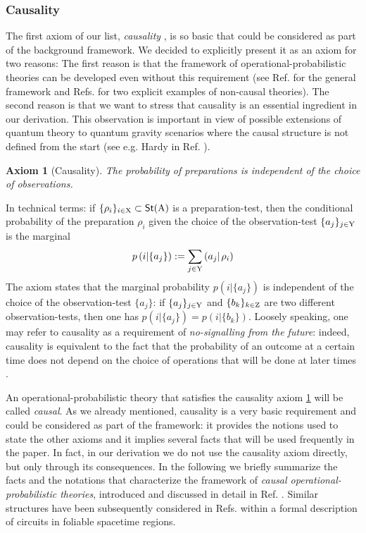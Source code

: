 \documentclass[12pt,aps,pra,showpacs,groupedaddress]{revtex4-1}
\newtheorem{axiom}{Axiom}\newtheorem{postulate}{Postulate}
\def\Stset{{\mathsf{St}}}
\def\SC#1#2{\left(#1\right|\left.\!#2\right)}  \def\Tr{{\rm Tr}}
\begin{document}
\subsubsection{Causality}


The first axiom of our list, \emph{causality} \cite{purification}, is so basic that could
be considered as part of the background framework. We decided to explicitly present it as an axiom for two reasons: The first reason is that the
framework of operational-probabilistic theories can be developed even
without this requirement (see Ref.\cite{purification} for the general
framework and Refs.  \cite{supermaps, comblong}  for two explicit
examples of non-causal theories).  The second reason is that we want
to stress that causality is an essential ingredient in our derivation.
This observation is important in view of possible extensions of
quantum theory to quantum gravity scenarios where the causal structure
is not defined from the start (see e.g. Hardy in Ref. \cite{causaloid}).

\begin{axiom}[Causality]\label{ax:caus}  
The probability of  preparations is independent  of the choice of observations.    
\end{axiom}  
In technical terms:  if  $\{\rho_i\}_{i \in \rX} \subset \Stset(\rA)$ is a preparation-test, then the conditional probability of the preparation $\rho_i$  given the choice of the 
  observation-test $\{a_j\}_{j \in {\rm Y}}$    is the marginal
  \begin{equation*} 
  p \left(i |  \{a_j\}  \right) := \sum_{j\in\rY} \SC {a_j} {\rho_i} 
  \end{equation*}
  The axiom states that the marginal probability $ p \left(i |  \{a_j\}  \right) $ is independent of the choice of the observation-test $\{a_j\}$: if $\{a_j\}_{j \in {\rm Y}}$ and
  $\{b_k\}_{k \in {\rm Z}}$ are two different observation-tests, then one has $p(i| \{a_j\}) = p(i|
  \{b_k\})$. Loosely speaking, one may refer to causality as a requirement of \emph{no-signalling
    from the future}: indeed, causality is equivalent to the fact that the probability of an outcome at a certain time
  does not depend on the choice of operations that will be done at later times \cite{maurolast}.


  An operational-probabilistic theory that satisfies the causality axiom \ref{ax:caus} will be
  called \emph{causal}.  As we already mentioned, causality is a very basic requirement and could be
  considered as part of the framework: it provides the notions used to state the other axioms and it
  implies several facts that will be used frequently in the paper.  In fact, in our derivation we do
  not use the causality axiom directly, but only through its consequences.  In the following we briefly summarize the facts and the
  notations that characterize the framework of \emph{causal operational-probabilistic theories},  introduced and discussed in detail in Ref.
\cite{purification}.   Similar structures have been subsequently considered in Refs. \cite{duotenz,caucat} within a formal description of  circuits in foliable spacetime regions. 
\end{document}
